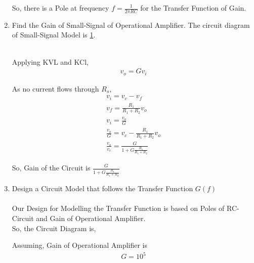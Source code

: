 \begin{enumerate}[label=\thesubsection.\arabic*.,ref=\thesubsection.\theenumi]
So, there is a Pole at frequency $f = \frac{1}{2\pi RC}$ for the Transfer Function of Gain.\\
\item Find the Gain of Small-Signal of Operational Amplifier. The circuit diagram of Small-Signal Model is \ref{fig:OpAmp Circuit}.
\begin{figure}[ht!]
	\begin{center}
		\resizebox{\columnwidth}{!}{}
	\end{center}
	\caption{}
	\label{fig:OpAmp Circuit}
\end{figure}

\solution\\
Applying KVL and KCl,
\begin{align}
v_{o} = Gv_{i}
\end{align}

As no current flows through $R_{s}$,
\begin{align}
v_{i} = v_{c} - v_{f}\\
v_{f} = \frac{R_{1}}{R_{1}+R_{2}}v_{o}\\
v_{i} = \frac{v_{o}}{G}\\
\frac{v_{o}}{G} = v_{c} - \frac{R_{1}}{R_{1}+R_{2}}v_{o}\\
\frac{v_{o}}{v_{c}} = \frac{G}{1+G\frac{R_{1}}{R_{1}+R_{2}}}
\end{align}

So, Gain of the Circuit is $\frac{G}{1+G\frac{R_{1}}{R_{1}+R_{2}}}$
\item Design a Circuit Model that follows the Transfer Function $G(f)$\\
\solution\\
Our Design for Modelling the Transfer Function is based on Poles of RC-Circuit and Gain of Operational Amplifier.\\

So, the Circuit Diagram is,
\begin{figure}[ht!]
	\begin{center}
		\resizebox{\columnwidth/1}{!}{}
	\end{center}
	\caption{}
	\label{fig:Circuit}
\end{figure}
 
Assuming, Gain of Operational Amplifier is
\begin{align}
G = 10^{5}
\end{align}


\end{enumerate}
